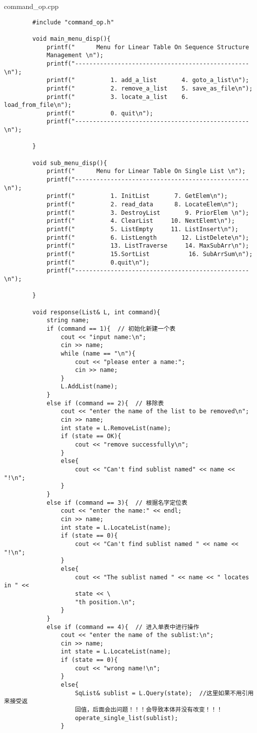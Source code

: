 \documentclass[supercite]{Experimental_Report}
\begin{document}
	command\_op.cpp
	\begin{lstlisting}
		#include "command_op.h"
		
		void main_menu_disp(){
			printf("      Menu for Linear Table On Sequence Structure 
			Management \n");
			printf("-------------------------------------------------\n");
			printf("    	  1. add_a_list       4. goto_a_list\n");
			printf("    	  2. remove_a_list    5. save_as_file\n");
			printf("    	  3. locate_a_list    6. load_from_file\n");
			printf("          0. quit\n");
			printf("-------------------------------------------------\n");
			
		}
		
		void sub_menu_disp(){
			printf("      Menu for Linear Table On Single List \n");
			printf("-------------------------------------------------\n");
			printf("    	  1. InitList       7. GetElem\n");
			printf("    	  2. read_data      8. LocateElem\n");
			printf("    	  3. DestroyList       9. PriorElem \n");
			printf("    	  4. ClearList     10. NextElemt\n");
			printf("    	  5. ListEmpty     11. ListInsert\n");
			printf("    	  6. ListLength       12. ListDelete\n");
			printf("    	  13. ListTraverse     14. MaxSubArr\n");  
			printf("          15.SortList           16. SubArrSum\n");  
			printf("          0.quit\n");
			printf("-------------------------------------------------\n");
			
		}
		
		void response(List& L, int command){
			string name;
			if (command == 1){  // 初始化新建一个表
				cout << "input name:\n";
				cin >> name;
				while (name == "\n"){
					cout << "please enter a name:";
					cin >> name;
				}
				L.AddList(name);
			}
			else if (command == 2){  // 移除表
				cout << "enter the name of the list to be removed\n";
				cin >> name;
				int state = L.RemoveList(name);
				if (state == OK){
					cout << "remove successfully\n";
				}
				else{
					cout << "Can't find sublist named" << name << "!\n";
				}
			}
			else if (command == 3){  // 根据名字定位表
				cout << "enter the name:" << endl;
				cin >> name;
				int state = L.LocateList(name);
				if (state == 0){
					cout << "Can't find sublist named " << name << "!\n";
				}
				else{
					cout << "The sublist named " << name << " locates in " << 
					state << \
					"th position.\n"; 
				}
			}
			else if (command == 4){  // 进入单表中进行操作
				cout << "enter the name of the sublist:\n";
				cin >> name;
				int state = L.LocateList(name);
				if (state == 0){
					cout << "wrong name!\n";
				}
				else{
					SqList& sublist = L.Query(state);  //这里如果不用引用来接受返
					回值，后面会出问题！！！会导致本体并没有改变！！！
					operate_single_list(sublist);
				}
				

\end{lstlisting}
\end{document}
